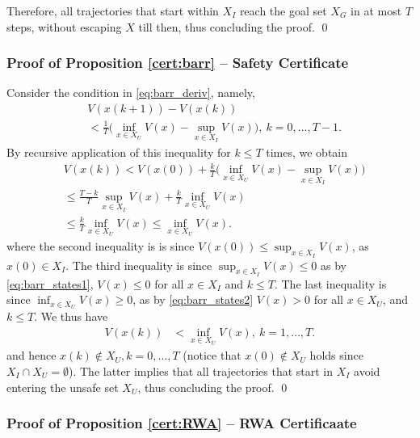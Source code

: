 Therefore, all trajectories that start within $X_I$ reach the goal set $X_G$ in at most $T$ steps, without escaping $X$ till then, thus concluding the proof. \qed

\subsubsection{Proof of Proposition \ref{cert:barr} -- Safety Certificate}

Consider the condition in \eqref{eq:barr_deriv}, namely,
    \begin{equation}
     \begin{aligned}
        &V(x(k+1))-V(x(k)) \\ &< \frac{1}{T} \Big( \inf_{x \in X_U}V(x)-\sup_{x \in X_I}V(x) \Big ),~ k=0,\dots,T-1.
     \end{aligned}
     \end{equation}
     By recursive application of this inequality for $k\leq T$ times, we obtain 
     \begin{align}
         &V(x(k)) < V(x(0)) + \frac{k}{T} \Big( \inf_{x \in X_U}V(x)-\sup_{x \in X_I}V(x) \Big ) \nonumber \\
         &\leq \frac{T-k}{T} \sup_{x \in X_I}V(x) + \frac{k}{T} \inf_{x \in X_U}V(x) \nonumber \\
         &\leq \frac{k}{T} \inf_{x \in X_U}V(x) \leq \inf_{x \in X_U}V(x). \label{eq:proof_safety}
     \end{align}
     where the second inequality is is since $V(x(0)) \leq \sup_{x \in X_I}V(x)$, as $x(0) \in X_I$. The third inequality is since $\sup_{x \in X_I}V(x) \leq 0$ as by \eqref{eq:barr_states1}, $V(x) \leq 0$ for all $x \in X_I$ and $k\leq T$. The last inequality is since $\inf_{x \in X_U}V(x)\geq 0$, as by \eqref{eq:barr_states2} $V(x) >0$ for all $x \in X_U$, and $k\leq T$.
     We thus have
           \begin{align}
       V(x(k)) &< \inf_{x \in X_U}V(x),~ k=1,\dots,T.
       \end{align}
       and hence $x(k) \notin X_U, k=0,\dots,T$ (notice that $x(0) \notin X_U$ holds since $X_I \cap X_U = \emptyset$). The latter implies that all trajectories that start in $X_I$ avoid entering the unsafe set $X_U$, thus concluding the proof. \qed

\subsubsection{Proof of Proposition \ref{cert:RWA} -- RWA Certificaate}

